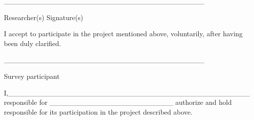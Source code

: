 \vspace{\baselineskip}


\vspace{\baselineskip}

\vspace{\baselineskip}

\vspace{\baselineskip}

\vspace{\baselineskip}

\vspace{\baselineskip}

\vspace{\baselineskip}

\begin{center} 
\_\_\_\_\_\_\_\_\_\_\_\_\_\_\_\_\_\_\_\_\_\_\_\_\_\_\_\_\_\_\_\_\_\_\_\_\_\_\_\par 
Researcher(s) Signature(s)\par 

\end{center} 

\vspace{\baselineskip} 

\vspace{\baselineskip} 

I accept to participate in the project mentioned above, voluntarily, after having been duly clarified. 

\begin{center} 

\vspace{\baselineskip} \_\_\_\_\_\_\_\_\_\_\_\_\_\_\_\_\_\_\_\_\_\_\_\_\_\_\_\_\_\_\_\_\_\_\_\_\_\_\_\par 
Survey participant \par 
\end{center} 

\vspace{\baselineskip} 

I,\_\_\_\_\_\_\_\_\_\_\_\_\_\_\_\_\_\_\_\_\_\_\_\_\_\_\_\_\_\_\_\_\_\_\_\_\_\_\_\_\_\_\_\_\_\_\_
responsible for \_\_\_\_\_\_\_\_\_\_\_\_\_\_\_\_\_\_\_\_\_\_\_\_ 
authorize and hold responsible for its participation in the project described above.
